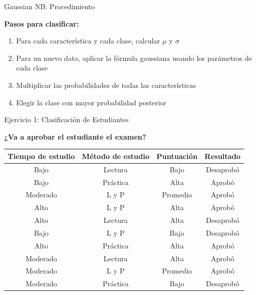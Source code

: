 \documentclass{beamer}
\begin{document}
\begin{frame}{Gaussian NB: Procedimiento}
    \begin{center}
        \textbf{Pasos para clasificar:}
    \end{center}

    \vspace{0.5cm}

    \begin{enumerate}
        \item Para cada característica y cada clase, calcular $\mu$ y $\sigma$

        \vspace{0.3cm}

        \item Para un nuevo dato, aplicar la fórmula gaussiana usando los parámetros de cada clase

        \vspace{0.3cm}

        \item Multiplicar las probabilidades de todas las características

        \vspace{0.3cm}

        \item Elegir la clase con mayor probabilidad posterior
    \end{enumerate}
\end{frame}

\begin{frame}{Ejercicio 1: Clasificación de Estudiantes}
    \begin{center}
        \textbf{¿Va a aprobar el estudiante el examen?}
        
        \vspace{0.5cm}
        
        \begin{tabular}{cccc}
            \toprule
            Tiempo de estudio & Método de estudio & Puntuación & Resultado \\
            \midrule
            Bajo & Lectura & Bajo & Desaprobó \\
            Bajo & Práctica & Alta & Aprobó \\
            Moderado & L y P & Promedio & Aprobó \\
            Alto & L y P & Alta & Aprobó \\
            Alto & Lectura & Alta & Desaprobó \\
            Bajo & L y P & Baja & Desaprobó \\
            Alto & Práctica & Alta & Aprobó \\
            Moderado & Lectura & Alta & Aprobó \\
            Moderado & L y P & Promedio & Aprobó \\
            Moderado & Práctica & Bajo & Desaprobó \\
            \bottomrule
        \end{tabular}
    \end{center}
\end{frame}
\end{document}
